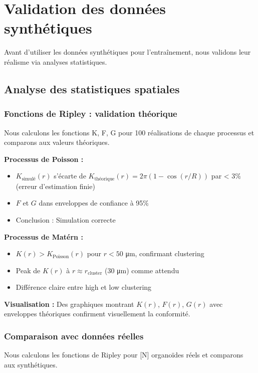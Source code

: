 \section{Validation des données synthétiques}

Avant d'utiliser les données synthétiques pour l'entraînement, nous validons leur réalisme via analyses statistiques.

\subsection{Analyse des statistiques spatiales}

\subsubsection{Fonctions de Ripley : validation théorique}

Nous calculons les fonctions K, F, G pour 100 réalisations de chaque processus et comparons aux valeurs théoriques.

\textbf{Processus de Poisson :}
\begin{itemize}
    \item $K_{\text{simulé}}(r)$ s'écarte de $K_{\text{théorique}}(r) = 2\pi(1-\cos(r/R))$ par < 3\% (erreur d'estimation finie)
    \item $F$ et $G$ dans enveloppes de confiance à 95\%
    \item Conclusion : Simulation correcte
\end{itemize}

\textbf{Processus de Matérn :}
\begin{itemize}
    \item $K(r) > K_{\text{Poisson}}(r)$ pour $r < 50$ μm, confirmant clustering
    \item Peak de $K(r)$ à $r \approx r_{\text{cluster}}$ (30 μm) comme attendu
    \item Différence claire entre high et low clustering
\end{itemize}

\textbf{Visualisation :}
Des graphiques montrant $K(r)$, $F(r)$, $G(r)$ avec enveloppes théoriques confirment visuellement la conformité.

\subsubsection{Comparaison avec données réelles}

Nous calculons les fonctions de Ripley pour [N] organoïdes réels et comparons aux synthétiques.

